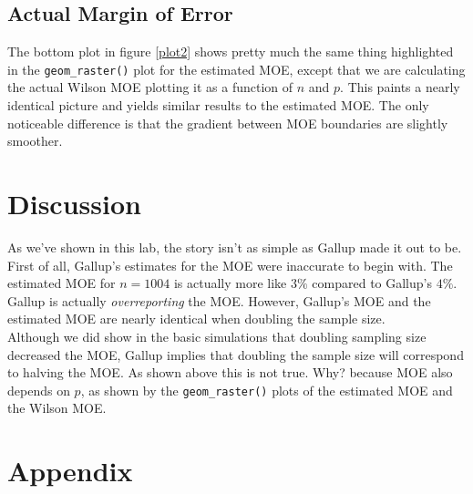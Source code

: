 \documentclass{article}\usepackage[]{graphicx}\usepackage[]{xcolor}
\begin{document}
\begin{multicols}{2}
\subsection{Actual Margin of Error}
The bottom plot in figure \ref{plot2} shows pretty much the same thing highlighted in the \verb|geom_raster()| plot for the estimated MOE, except that we are calculating the actual Wilson MOE plotting it as a function of $n$ and $p$. This paints a nearly identical picture and yields similar results to the estimated MOE. The only noticeable difference is that the gradient between MOE boundaries are slightly smoother.

\section{Discussion}
As we've shown in this lab, the story isn't as simple as Gallup made it out to be. First of all, Gallup's estimates for the MOE were inaccurate to begin with. The estimated MOE for $n=1004$ is actually more like $3\%$ compared to Gallup's $4\%$. Gallup is actually \emph{overreporting} the MOE. However, Gallup's MOE and the estimated MOE are nearly identical when doubling the sample size. \\
\indent Although we did show in the basic simulations that doubling sampling size decreased the MOE, Gallup implies that doubling the sample size will correspond to halving the MOE. As shown above this is not true. Why? because MOE also depends on $p$, as shown by the \verb|geom_raster()| plots of the estimated MOE and the Wilson MOE. \\

\vspace{2em}

\begin{tiny}

\end{tiny}
\end{multicols}

\newpage
\onecolumn
\section{Appendix}
\end{document}
